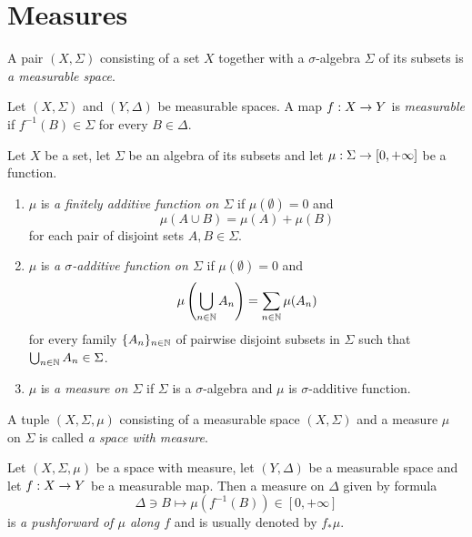 \section{Measures}

\begin{definition}
    A pair $(X,\Sigma)$ consisting of a set $X$ together with a $\sigma$-algebra $\Sigma$ of its subsets is \textit{a measurable space}.
\end{definition}

\begin{definition}
    Let $(X,\Sigma)$ and $(Y,\Delta)$ be measurable spaces. A map $f:X\rightarrow Y$ is \textit{measurable} if $f^{-1}(B)\in \Sigma$ for every $B\in \Delta$.
\end{definition}

\begin{definition}
    Let $X$ be a set, let $\Sigma$ be an algebra of its subsets and let $\mu:\Sigma \rightarrow [0,+\infty]$ be a function.
    \begin{enumerate}[label=\textbf{(\arabic*)}, leftmargin=*]
        \item $\mu$ is \textit{a finitely additive function on $\Sigma$} if $\mu(\emptyset) = 0$ and
              $$\mu\left(A\cup B\right) = \mu(A) + \mu(B)$$
              for each pair of disjoint sets $A,B\in \Sigma$.
        \item $\mu$ is \textit{a $\sigma$-additive function on $\Sigma$} if $\mu(\emptyset) = 0$ and
              $$\mu\left(\bigcup_{n\in {\mathbb N}}A_n\right)=\sum_{n\in {\mathbb N}}\mu(A_n)$$
              for every family  $\{A_n\}_{n\in {\mathbb N}}$ of pairwise disjoint subsets in $\Sigma$ such that $\bigcup_{n\in {\mathbb N}}A_n\in \Sigma$.
        \item $\mu$ is \textit{a measure on $\Sigma$} if $\Sigma$ is a $\sigma$-algebra and $\mu$ is $\sigma$-additive function.
    \end{enumerate}
\end{definition}

\begin{definition}
    A tuple $(X,\Sigma,\mu)$ consisting of a measurable space $\left(X,\Sigma\right)$ and a measure $\mu$ on $\Sigma$ is called \textit{a space with measure}.
\end{definition}

\begin{definition}
    Let $(X,\Sigma,\mu)$ be a space with measure, let $(Y,\Delta)$ be a measurable space and let $f:X\rightarrow Y$ be a measurable map. Then a measure on $\Delta$ given by formula
    $$\Delta \ni B \mapsto \mu\left(f^{-1}(B)\right) \in [0,+\infty]$$
    is \textit{a pushforward of $\mu$ along $f$} and is usually denoted by $f_*\mu$.
\end{definition}

